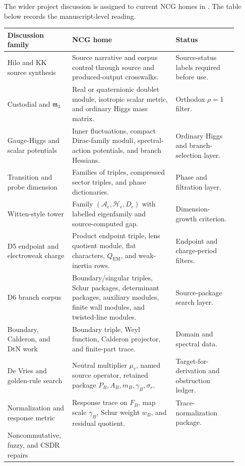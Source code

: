 \documentclass[11pt]{article}
\newcommand{\mthree}{\mathfrak m_3}
\begin{document}
The wider project discussion is assigned to current NCG homes in
\cite{ncg-legacy-coverage}.  The table below records the manuscript-level
reading.
\begin{center}
\small
\begin{tabular}{@{}L{0.25\linewidth}L{0.42\linewidth}L{0.25\linewidth}@{}}
\toprule
Discussion family & NCG home & Status \\
\midrule
Hilo and KK source synthesis
  & Source narrative and corpus control through source and produced-output
    crosswalks.
  & Source-status labels required before use. \\
Custodial and \(\mthree\)
  & Real or quaternionic doublet module, isotropic scalar metric, and
    ordinary Higgs mass matrix.
  & Orthodox \(\rho=1\) filter. \\
Gauge-Higgs and scalar potentials
  & Inner fluctuations, compact Dirac-family moduli, spectral-action
    potentials, and branch Hessians.
  & Ordinary Higgs and branch-selection layer. \\
Transition and probe dimension
  & Families of triples, compressed sector triples, and phase dictionaries.
  & Phase and filtration layer. \\
Witten-style tower
  & Family \((\mathcal A_\epsilon,\mathcal H_\epsilon,D_\epsilon)\) with
    labelled eigenfamily and source-computed gap.
  & Dimension-growth criterion. \\
D5 endpoint and electroweak charge
  & Product endpoint triple, lens quotient module, flat characters,
    \(Q_{\mathrm{EM}}\), and weak-inertia rows.
  & Endpoint and charge-period filters. \\
D6 branch corpus
  & Boundary/singular triples, Schur packages, determinant packages,
    auxiliary modules, finite wall modules, and twisted-line modules.
  & Source-package search layer. \\
Boundary, Calderon, and DtN work
  & Boundary triple, Weyl function, Calderon projector, and finite-part
    trace.
  & Domain and spectral data. \\
De Vries and golden-rule search
  & Neutral multiplier \(\mu_r\), named source operator, retained package
    \(P_B,A_B,m_B,\gamma_B,\sigma_r\).
  & Target-for-derivation and obstruction ledger. \\
Normalization and response metric
  & Response trace on \(F_B\), map scale \(\gamma_B\), Schur weight \(w_B\),
    and residual quotient.
  & Trace-normalization package. \\
Noncommutative, fuzzy, and CSDR repairs

\end{tabular}
\end{center}
\end{document}
